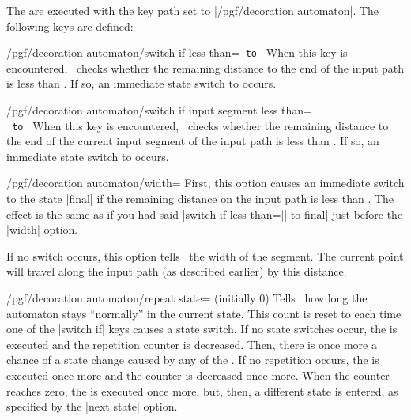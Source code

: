 \begin{command}{\pgfdeclaredecoration{}}
\begin{command}{\state{}}
        The  are executed with the key path set to
        |/pgf/decoration automaton|. The following keys are defined:
        \begin{key}{/pgf/decoration automaton/switch if less than=\texttt{ to }}
            When this key is encountered, \pgfname\ checks whether the
            remaining distance to the end of the input path is less than
            . If so, an immediate state switch to  occurs.
        \end{key}
        \begin{key}{/pgf/decoration automaton/switch if input segment less than=\\\texttt{ to }}
            When this key is encountered, \pgfname\ checks whether the
            remaining distance to the end of the current input segment of the
            input path is less than . If so, an immediate state
            switch to  occurs.
        \end{key}
        \begin{key}{/pgf/decoration automaton/width=}
            First, this option causes an immediate switch to the state |final|
            if the remaining distance on the input path is less than
            . The effect is the same as if you had said |switch
            if less than=|| to final| just before the |width|
            option.

            If no switch occurs, this option tells \pgfname\ the width of the
            segment. The current point will travel along the input path (as
            described earlier) by this distance.
        \end{key}
        \begin{key}{/pgf/decoration automaton/repeat state= (initially 0)}
            Tells \pgfname\ how long the automaton stays ``normally'' in the
            current state. This count is reset to  each time
            one of the |switch if| keys causes a state switch. If no state
            switches occur, the  is executed and the repetition
            counter is decreased. Then, there is once more a chance of a state
            change caused by any of the . If no repetition
            occurs, the  is executed once more and the counter is
            decreased once more. When the counter reaches zero, the 
            is executed once more, but, then, a different state is entered, as
            specified by the |next state| option.


\end{key}
\end{command}
\end{command}
